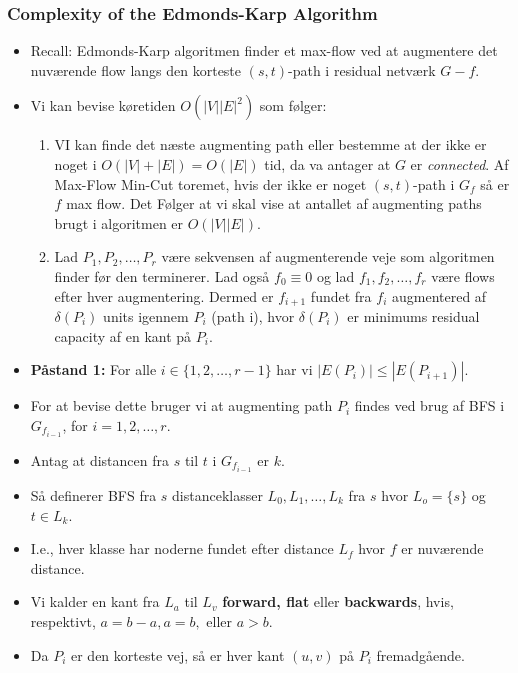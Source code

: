 \documentclass{beamer}
\begin{document}
\begin{frame}[allowframebreaks]
  \frametitle{Complexity of the Edmonds-Karp Algorithm}
  \begin{itemize}
    \begin{itemize}
    \item Recall: Edmonds-Karp algoritmen finder et max-flow ved at augmentere det nuværende flow langs den korteste $(s,t)$-path i residual netværk $G-f$. 
    \item Vi kan bevise køretiden $O(|V||E|^{2})$  som følger:
      \begin{enumerate}
      \item VI kan finde det næste augmenting path eller bestemme at der ikke er noget i $O(|V|+|E|) = O(|E|)$ tid, da va antager at $G$ er \textit{connected}. Af Max-Flow Min-Cut toremet, hvis der ikke er noget $(s,t)$-path i $G_{f}$ så er $f$ max flow. Det Følger at vi skal vise at antallet af augmenting paths brugt i algoritmen er $O(|V||E|)$.
      \item\label{item:1} Lad $P_{1}, P_{2}, \ldots, P_{r}$ være sekvensen af augmenterende veje som algoritmen finder før den terminerer. Lad også $f_{0} \equiv 0$ og lad $f_{1}, f_{2}, \ldots, f_{r}$ være flows efter hver augmentering. Dermed er $f_{i+1}$ fundet fra $f_{i}$ augmentered af $\delta (P_{i})$ units igennem $P_{i}$ (path i), hvor $\delta (P_{i})$ er minimums residual capacity af en kant på $P_{i}$.
      \end{enumerate}
      \item \textbf{Påstand 1:} For alle $i \in \{1,2, \ldots, r-1\}$ har vi $|E(P_i)| \leq |E(P_{i+1})|$.
      \item For at bevise dette bruger vi at augmenting path $P_{i}$ findes ved brug af BFS i $G_{f_{i-1}}$, for $i = 1, 2, \ldots, r$. 
      \item Antag at distancen fra $s$ til $t$ i $G_{f_{i-1}}$ er $k$.
      \item Så definerer BFS fra $s$ distanceklasser $L_{0}, L_{1}, \ldots, L_{k}$ fra $s$ hvor $L_{o} = \{s\}$ og $t \in L_{k}$. 
      \item I.e., hver klasse har noderne fundet efter distance $L_{f}$ hvor $f$ er nuværende distance. 
      \item Vi kalder en kant fra $L_{a}$ til $L_{v}$ \textbf{forward, flat} eller \textbf{backwards}, hvis, respektivt, $a = b-a, a = b, \text{ eller } a > b$.
      \item Da $P_{i}$ er den korteste vej, så er hver kant $(u,v)$ på $P_i$ fremadgående.

\end{itemize}
\end{itemize}
\end{frame}
\end{document}
